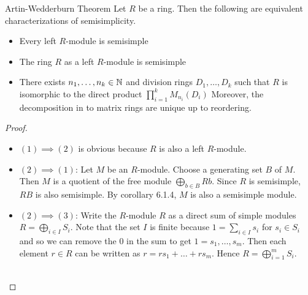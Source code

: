 \documentclass[a4paper]{article}
\begin{document}
\begin{thm}{Artin-Wedderburn Theorem}{} Let $R$ be a ring. Then the following are equivalent characterizations of semisimplicity. 
\begin{itemize}
\item Every left $R$-module is semisimple
\item The ring $R$ as a left $R$-module is semisimple
\item There exists $n_1,\dots,n_k\in\mathbb{N}$ and division rings $D_1,\dots,D_k$ such that $R$ is isomorphic to the direct product $\prod_{i=1}^kM_{n_i}(D_i)$ Moreover, the decomposition in to matrix rings are unique up to reordering. 
\end{itemize} \tcbline
\begin{proof}~\\
\begin{itemize}
\item $(1)\implies(2)$ is obvious because $R$ is also a left $R$-module. 
\item $(2)\implies(1)$: Let $M$ be an $R$-module. Choose a generating set $B$ of $M$. Then $M$ is a quotient of the free module $\bigoplus_{b\in B}Rb$. Since $R$ is semisimple, $RB$ is also semisimple. By corollary 6.1.4, $M$ is also a semisimple module. 
\item $(2)\implies(3)$: Write the $R$-module $R$ as a direct sum of simple modules $R=\bigoplus_{i\in I}S_i$. Note that the set $I$ is finite because $1=\sum_{i\in I}s_i$  for $s_i\in S_i$ and so we can remove the $0$ in the sum to get $1=s_1,\dots,s_m$. Then each element $r\in R$ can be written as $r=rs_1+\dots+rs_m$. Hence $R=\bigoplus_{i=1}^mS_i$. \\~\\


\end{itemize}
\end{proof}
\end{thm}
\end{document}
